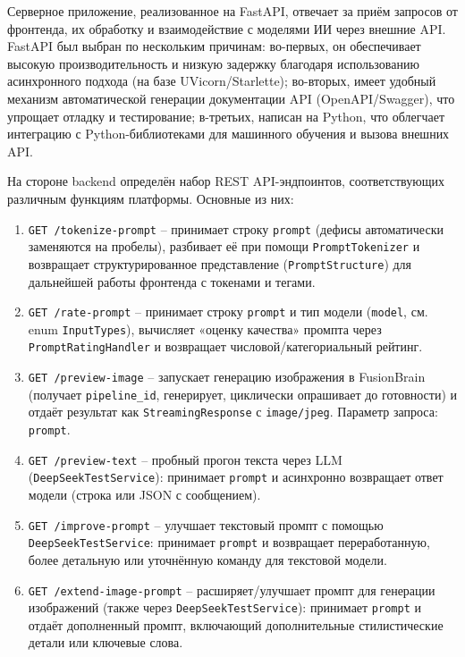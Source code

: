 Серверное приложение, реализованное на FastAPI, отвечает за приём запросов от фронтенда, их обработку и взаимодействие с моделями ИИ через внешние API. FastAPI был выбран по нескольким причинам: во-первых, он обеспечивает высокую производительность и низкую задержку благодаря использованию асинхронного подхода (на базе UVicorn/Starlette); во-вторых, имеет удобный механизм автоматической генерации документации API (OpenAPI/Swagger), что упрощает отладку и тестирование; в-третьих, написан на Python, что облегчает интеграцию с Python-библиотеками для машинного обучения и вызова внешних API.

На стороне backend определён набор REST API-эндпоинтов, соответствующих различным функциям платформы. Основные из них:
\begin{enumerate}[label=\arabic*]
\item \verb|GET /tokenize-prompt| -- принимает строку \verb|prompt| (дефисы автоматически заменяются на пробелы), разбивает её при помощи \verb|PromptTokenizer| и возвращает структурированное представление (\verb|PromptStructure|) для дальнейшей работы фронтенда с токенами и тегами.

\item \verb|GET /rate-prompt| -- принимает строку \verb|prompt| и тип модели (\verb|model|, см. enum \verb|InputTypes|), вычисляет «оценку качества» промпта через \verb|PromptRatingHandler| и возвращает числовой/категориальный рейтинг.

\item \verb|GET /preview-image| -- запускает генерацию изображения в FusionBrain\cite{fusionbrain:docs} (получает \verb|pipeline_id|, генерирует, циклически опрашивает до готовности) и отдаёт результат как \verb|StreamingResponse| с \verb|image/jpeg|. Параметр запроса: \verb|prompt|.

\item \verb|GET /preview-text| -- пробный прогон текста через LLM (\verb|DeepSeekTestService|): принимает \verb|prompt| и асинхронно возвращает ответ модели (строка или JSON с сообщением).

\item \verb|GET /improve-prompt| -- улучшает текстовый промпт с помощью \verb|DeepSeekTestService|: принимает \verb|prompt| и возвращает переработанную, более детальную или уточнённую команду для текстовой модели.

\item \verb|GET /extend-image-prompt| -- расширяет/улучшает промпт для генерации изображений (также через \verb|DeepSeekTestService|): принимает \verb|prompt| и отдаёт дополненный промпт, включающий дополнительные стилистические детали или ключевые слова.
\end{enumerate}

